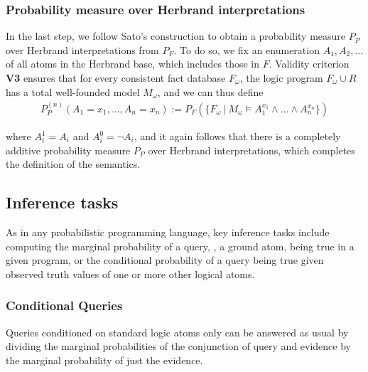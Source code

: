 \subsubsection{Probability measure over Herbrand interpretations}
In the last step, we follow Sato's construction to obtain a probability measure $P_P$ over Herbrand interpretations from $P_F$. To do so, we fix an enumeration $A_1,A_2,\ldots$ of all atoms in the Herbrand base, which includes those in $F$. 
Validity criterion {\bf V3} ensures that for every consistent fact database $F_{\omega}$, the logic program $F_{\omega}\cup R$ has a total well-founded model $M_{\omega}$, and we can thus define   
\begin{align}
P_P^{(n)}(A_1=x_1,\ldots,A_n=x_n) := P_F(\{F_{\omega}~|~ M_{\omega}\models A_1^{x_1}\wedge\ldots\wedge A_n^{x_n}\})
\end{align}


where $A_i^1=A_i$ and $A_i^0=\neg A_i$, and it again follows that there is a completely additive probability measure $P_P$ over Herbrand interpretations, which completes the definition of the semantics. 




\subsection{Inference tasks}\label{sec:inference-tasks}
As in any probabilistic programming language, key inference tasks include computing the marginal probability of a query, \ie, a ground atom, being true in a given program, or the conditional probability of a query being true given observed truth values of one or more other logical atoms.

\subsubsection{Conditional Queries}

Queries conditioned  on standard logic atoms only  can be answered as usual by dividing the marginal probabilities of the conjunction of query and evidence by the marginal probability of just the evidence. 


